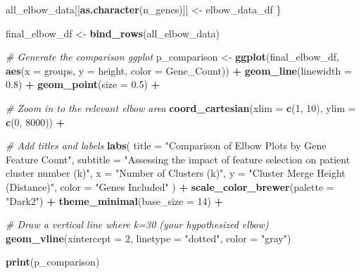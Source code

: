 \documentclass[
]{article}
\newenvironment{Shaded}{\begin{snugshade}}{\end{snugshade}}
\newcommand{\AttributeTok}[1]{\textcolor[rgb]{0.13,0.29,0.53}{#1}}
\newcommand{\CommentTok}[1]{\textcolor[rgb]{0.56,0.35,0.01}{\textit{#1}}}
\newcommand{\DecValTok}[1]{\textcolor[rgb]{0.00,0.00,0.81}{#1}}
\newcommand{\FloatTok}[1]{\textcolor[rgb]{0.00,0.00,0.81}{#1}}
\newcommand{\FunctionTok}[1]{\textcolor[rgb]{0.13,0.29,0.53}{\textbf{#1}}}
\newcommand{\NormalTok}[1]{#1}
\newcommand{\OtherTok}[1]{\textcolor[rgb]{0.56,0.35,0.01}{#1}}
\newcommand{\SpecialCharTok}[1]{\textcolor[rgb]{0.81,0.36,0.00}{\textbf{#1}}}
\newcommand{\StringTok}[1]{\textcolor[rgb]{0.31,0.60,0.02}{#1}}
\begin{document}
\begin{Shaded}
\begin{Highlighting}[]
\NormalTok{  all\_elbow\_data[[}\FunctionTok{as.character}\NormalTok{(n\_genes)]] }\OtherTok{\textless{}{-}}\NormalTok{ elbow\_data\_df}
\NormalTok{\}}

\NormalTok{final\_elbow\_df }\OtherTok{\textless{}{-}} \FunctionTok{bind\_rows}\NormalTok{(all\_elbow\_data)}

\CommentTok{\# Generate the comparison ggplot}
\NormalTok{p\_comparison }\OtherTok{\textless{}{-}} \FunctionTok{ggplot}\NormalTok{(final\_elbow\_df, }\FunctionTok{aes}\NormalTok{(}\AttributeTok{x =}\NormalTok{ groups, }\AttributeTok{y =}\NormalTok{ height, }\AttributeTok{color =}\NormalTok{ Gene\_Count)) }\SpecialCharTok{+}
  \FunctionTok{geom\_line}\NormalTok{(}\AttributeTok{linewidth =} \FloatTok{0.8}\NormalTok{) }\SpecialCharTok{+}
  \FunctionTok{geom\_point}\NormalTok{(}\AttributeTok{size =} \FloatTok{0.5}\NormalTok{) }\SpecialCharTok{+}
  
  \CommentTok{\# Zoom in to the relevant elbow area}
  \FunctionTok{coord\_cartesian}\NormalTok{(}\AttributeTok{xlim =} \FunctionTok{c}\NormalTok{(}\DecValTok{1}\NormalTok{, }\DecValTok{10}\NormalTok{), }\AttributeTok{ylim =} \FunctionTok{c}\NormalTok{(}\DecValTok{0}\NormalTok{, }\DecValTok{8000}\NormalTok{)) }\SpecialCharTok{+} 
  
  \CommentTok{\# Add titles and labels}
  \FunctionTok{labs}\NormalTok{(}
    \AttributeTok{title =} \StringTok{"Comparison of Elbow Plots by Gene Feature Count"}\NormalTok{,}
    \AttributeTok{subtitle =} \StringTok{"Assessing the impact of feature selection on patient cluster number (k)"}\NormalTok{,}
    \AttributeTok{x =} \StringTok{"Number of Clusters (k)"}\NormalTok{,}
    \AttributeTok{y =} \StringTok{"Cluster Merge Height (Distance)"}\NormalTok{,}
    \AttributeTok{color =} \StringTok{"Genes Included"}
\NormalTok{  ) }\SpecialCharTok{+}
  \FunctionTok{scale\_color\_brewer}\NormalTok{(}\AttributeTok{palette =} \StringTok{"Dark2"}\NormalTok{) }\SpecialCharTok{+}
  \FunctionTok{theme\_minimal}\NormalTok{(}\AttributeTok{base\_size =} \DecValTok{14}\NormalTok{) }\SpecialCharTok{+}
  
  \CommentTok{\# Draw a vertical line where k=30 (your hypothesized elbow)}
  \FunctionTok{geom\_vline}\NormalTok{(}\AttributeTok{xintercept =} \DecValTok{2}\NormalTok{, }\AttributeTok{linetype =} \StringTok{"dotted"}\NormalTok{, }\AttributeTok{color =} \StringTok{"gray"}\NormalTok{)}

\FunctionTok{print}\NormalTok{(p\_comparison)}
\end{Highlighting}
\end{Shaded}
\end{document}
